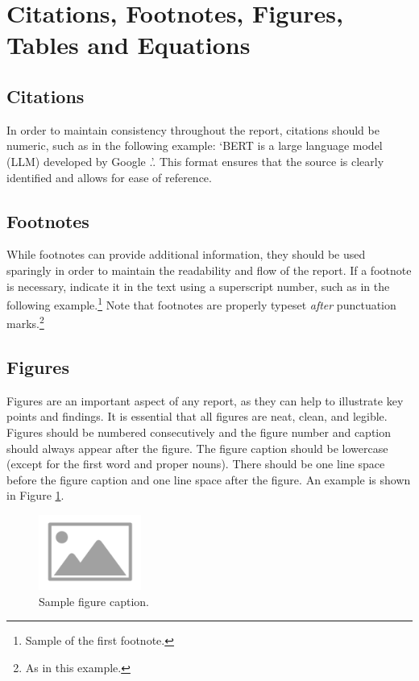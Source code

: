 \documentclass{article}
\begin{document}
\section{Citations, Footnotes, Figures, Tables and Equations}
\subsection{Citations}

In order to maintain consistency throughout the report, citations should be numeric, such as in the following example: `BERT is a large language model (LLM) developed by Google \cite{Devlin2019BERTPO}.'. This format ensures that the source is clearly identified and allows for ease of reference.


\subsection{Footnotes}

While footnotes can provide additional information, they should be used sparingly in order to maintain the readability and flow of the report. If a footnote is necessary, indicate it in the text using a superscript number, such as in the following example.\footnote{Sample of the first footnote.}
%
Note that footnotes are properly typeset \emph{after} punctuation marks.\footnote{As in this example.}



\subsection{Figures}

Figures are an important aspect of any report, as they can help to illustrate key points and findings. It is essential that all figures are neat, clean, and legible. Figures should be numbered consecutively and the figure number and caption should always appear after the figure. The figure caption should be lowercase (except for the first word and proper nouns). There should be one line space before the figure caption and one line space after the figure. An example is shown in Figure \ref{fig:example}.

\begin{figure}[h]
  \centering
  \includegraphics[width=0.3\textwidth]{images/placeholder-image.png}
  \caption{Sample figure caption.}
  \label{fig:example}
\end{figure}
\end{document}
